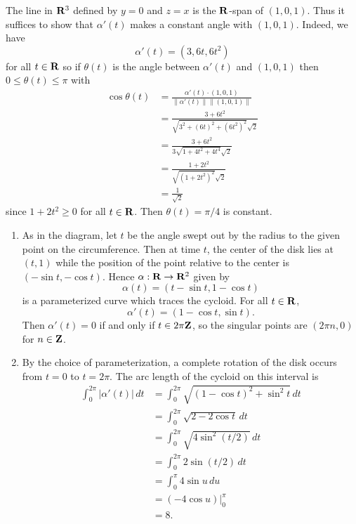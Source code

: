 \begin{ex}
The line in $\mathbf{R}^3$ defined by $y = 0$ and $z = x$ is the $\mathbf{R}$-span of $(1, 0, 1)$. Thus it suffices to show that $\alpha'(t)$ makes a constant angle with $(1, 0, 1)$. Indeed, we have \[\alpha'(t) = (3, 6t, 6t^2)\] for all $t \in \mathbf{R}$ so if $\theta(t)$ is the angle between $\alpha'(t)$ and $(1, 0, 1)$ then $0\leq\theta(t)\leq\pi$ with
\begin{align*}
\cos\theta(t) & = \frac{\alpha'(t)\cdot (1, 0, 1)}{\|\alpha'(t)\|\|(1, 0, 1)\|}\\
& = \frac{3 + 6t^2}{\sqrt{3^2 + (6t)^2 + (6t^2)^2}\sqrt{2}}\\
& = \frac{3 + 6t^2}{3\sqrt{1 + 4t^2 + 4t^4}\sqrt{2}}\\
& = \frac{1 + 2t^2}{\sqrt{(1+2t^2)^2}\sqrt{2}}\\
& = \frac{1}{\sqrt{2}}
\end{align*}
since $1+2t^2 \geq 0$ for all $t \in \mathbf{R}$. Then $\theta(t) = \pi/4$ is constant.
\end{ex}

\begin{ex}
\begin{enumerate}
\item As in the diagram, let $t$ be the angle swept out by the radius to the given point on the circumference. Then at time $t$, the center of the disk lies at $(t, 1)$ while the position of the point relative to the center is $(-\sin t, -\cos t)$. Hence $\alpha: \mathbf{R} \to \mathbf{R}^2$ given by \[\alpha(t) = (t - \sin t, 1 - \cos t)\] is a parameterized curve which traces the cycloid. For all $t \in \mathbf{R}$, \[\alpha'(t) = (1 - \cos t, \sin t).\] Then $\alpha'(t) = 0$ if and only if $t \in 2\pi\mathbf{Z}$, so the singular points are $(2\pi n, 0)$ for $n \in \mathbf{Z}$.

\item By the choice of parameterization, a complete rotation of the disk occurs from $t = 0$ to $t = 2\pi$. The arc length of the cycloid on this interval is
\begin{align*}
\int_0^{2\pi}|\alpha'(t)|\,dt & = \int_0^{2\pi}\sqrt{(1-\cos t)^2 + \sin^2t}\,dt\\
& = \int_0^{2\pi}\sqrt{2-2\cos t}\,dt\\
& = \int_0^{2\pi}\sqrt{4\sin^2(t/2)}\,dt\\
& = \int_0^{2\pi}2\sin(t/2)\,dt\\
& = \int_0^{\pi}4\sin u\,du\\
& = (-4\cos u)\big|_0^{\pi}\\
& = 8.
\end{align*}
\end{enumerate}
\end{ex}

